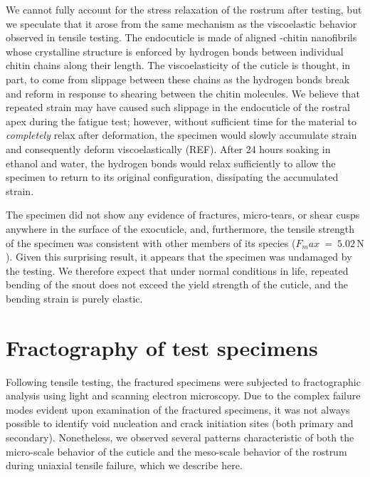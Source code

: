\documentclass[twocolumn, linenumbers, superscriptaddress]{revtex4-1}
\begin{document}
		We cannot fully account for the stress relaxation of the rostrum after testing, but we speculate that it arose from the same mechanism as the viscoelastic behavior observed in tensile testing.
		The endocuticle is made of aligned \textalpha-chitin nanofibrils whose crystalline structure is enforced by hydrogen bonds between individual chitin chains along their length.
		The viscoelasticity of the cuticle is thought, in part, to come from slippage between these chains as the hydrogen bonds break and reform in response to shearing between the chitin molecules.
		We believe that repeated strain may have caused such slippage in the endocuticle of the rostral apex during the fatigue test; however, without sufficient time for the material to \textit{completely} relax after deformation, the specimen would slowly accumulate strain and consequently deform viscoelastically (REF).
		After 24 hours soaking in ethanol and water, the hydrogen bonds would relax sufficiently to allow the specimen to return to its original configuration, dissipating the accumulated strain.
		
		The specimen did not show any evidence of fractures, micro-tears, or shear cusps anywhere in the surface of the exocuticle, and, furthermore, the tensile strength of the specimen was consistent with other members of its species ($F_max~=~5.02\,\text{N}$).
		Given this surprising result, it appears that the specimen was undamaged by the testing.
		We therefore expect that under normal conditions in life, repeated bending of the snout does not exceed the yield strength of the cuticle, and the bending strain is purely elastic.
			
	\section{Fractography of test specimens}
		Following tensile testing, the fractured specimens were subjected to fractographic analysis using light and scanning electron microscopy.
		Due to the complex failure modes evident upon examination of the fractured specimens, it was not always possible to identify void nucleation and crack initiation sites (both primary and secondary).
		Nonetheless, we observed several patterns characteristic of both the micro-scale behavior of the cuticle and the meso-scale behavior of the rostrum during uniaxial tensile failure, which we describe here.
		
\end{document}

